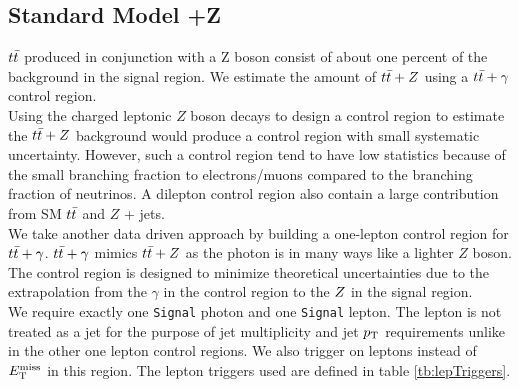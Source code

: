 \subsection{Standard Model \ttbar+Z}
\label{sec:Bkg:ttV}

\indent $t\bar{t}$ produced in conjunction with a Z boson consist of about one percent of the background in the signal region.  We estimate the amount of $t\bar{t}+Z$ using a $t\bar{t}+\gamma$ control region. \\

\indent Using the charged leptonic $Z$ boson decays to design a control region to estimate the $t\bar{t}+Z$ background would produce a control region with small systematic uncertainty. However, such a control region tend to have low statistics because of the small branching fraction to electrons/muons compared to the branching fraction of neutrinos.  A dilepton control region also contain a large contribution from SM $t\bar{t}$ and $Z$ + jets. \\

\indent We take another data driven approach by building a one-lepton control region for $t\bar{t}+\gamma$.  $t\bar{t}+\gamma$ mimics $t\bar{t}+Z$ as the photon is in many ways like a lighter $Z$ boson.  The control region is designed to minimize theoretical uncertainties due to the extrapolation from the $\gamma$ in the control region to the $Z$ in the signal region. \\

\indent We require exactly one {\tt Signal} photon and one {\tt Signal} lepton.  The lepton is not treated as a jet for the purpose of jet multiplicity and jet $p_{\mathrm{T}}$ requirements unlike in the other one lepton control regions.  We also trigger on leptons instead of $E_{\mathrm{T}}^{\mathrm{miss}}$ in this region. The lepton triggers used are defined in table \ref{tb:lepTriggers}.  \\

